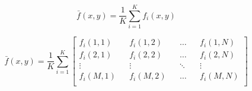 \documentclass[../main.tex]{subfiles}%
\begin{document}
%
    \Xequation%
    \begin{equation*}%
        \bar{f}(x,y) =%
        \dfrac{1}{K}%
        \sum^{K}_{i=1}%
        f_{i}(x,y)%
    \end{equation*}%
    \par%
    \begin{equation}%
        \bar{f}(x,y) =%
        \dfrac{1}{K}%
        \sum^{K}_{i=1}%
        \begin{bmatrix}%
            f_{i}(1,1) && f_{i}(1,2) && \dots && f_{i}(1,N) \\%
            f_{i}(2,1) && f_{i}(2,2) && \dots && f_{i}(2,N) \\%
            \vdots && \vdots && \ddots && \vdots \\%
            f_{i}(M,1) && f_{i}(M,2) && \dots && f_{i}(M,N) \\%
        \end{bmatrix}%
        \label{eq:image-matrix-average}%
    \end{equation}%
\end{document}
